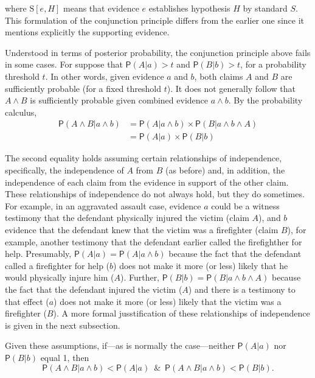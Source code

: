 \documentclass[10pt,dvipsnames,enabledeprecatedfontcommands]{scrartcl}
\newcommand{\et}{\wedge}
\newcommand{\pr}[1]{\mathsf{P}(#1)}
\begin{document}
\noindent where \(\text{S}[e, H]\) means that evidence \(e\) establishes
hypothesis \(H\) by standard \(S\). This formulation of the conjunction
principle differs from the earlier one since it mentions explicitly the
supporting evidence.

Understood in terms of posterior probability, the conjunction principle
above fails in some cases. For suppose that \(\pr{A | a}>t\) and
\(\pr{B | b}>t\), for a probability threshold \(t\). In other words,
given evidence \(a\) and \(b\), both claims \(A\) and \(B\) are
sufficiently probable (for a fixed threshold \(t\)). It does not
generally follow that \(A \et B\) is sufficiently probable given
combined evidence \(a\et b\). By the probability calculus,
\begin{align*}
\pr{A \wedge  B | a \wedge b}& =\pr{A |a \wedge b} \times \pr{B | a \wedge b \wedge A}\\
 & = \pr{A |a} \times \pr{B | b}
 \end{align*}

\noindent {} The second
equality holds assuming certain relationships of independence,
specifically, the independence of \(A\) from \(B\) (as before) and, in
addition, the independence of each claim from the evidence in support of
the other claim. These relationships of independence do not always hold,
but they do sometimes. For example, in an aggravated assault case,
evidence \(a\) could be a witness testimony that the defendant
physically injured the victim (claim \(A\)), and \(b\) evidence that the
defendant knew that the victim was a firefighter (claim \(B\)), for
example, another testimony that the defendant earlier called the
firefighther for help. Presumably,
\(\pr{A \vert a}=\pr{A \vert a \wedge b}\) because the fact that the
defendant called a firefighter for help (\(b\)) does not make it more
(or less) likely that he would physically injure him (\(A\)). Further,
\(\pr{B \vert b}=\pr{B \vert a \wedge b \wedge A}\) because the fact
that the defendant injured the victim (\(A\)) and there is a testimony
to that effect (\(a\)) does not make it more (or less) likely that the
victim was a firefighter (\(B\)). A more formal jusstification of these
relationships of independence is given in the next subsection.

Given these assumptions, if---as is normally the case---neither
\(\pr{A \vert a}\) nor \(\pr{B \vert b}\) equal 1, then
\[\pr{A \wedge B \vert a \wedge b}< \pr{A \vert a} \;\ \& \;\ \pr{A \wedge B \vert a \wedge b} < \pr{B \vert b}. \]
\end{document}
